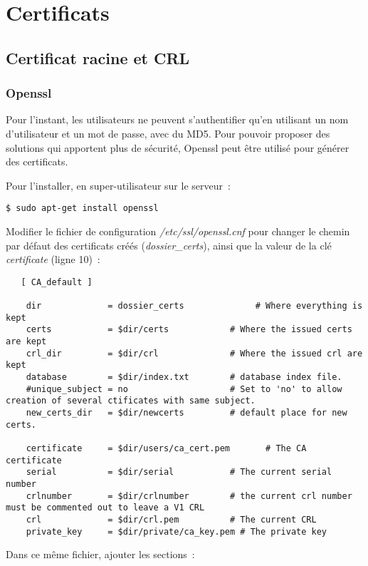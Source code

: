 \section{Certificats}
\subsection{Certificat racine et CRL}
\subsubsection{Openssl}

Pour l'instant, les utilisateurs ne peuvent s'authentifier qu'en utilisant un nom d'utilisateur et un mot de passe, avec du MD5. Pour pouvoir proposer des solutions qui apportent plus de sécurité, Openssl peut être utilisé pour générer des certificats.

Pour l'installer, en super-utilisateur sur le serveur~:

\begin{lstlisting}
$ sudo apt-get install openssl
\end{lstlisting}

Modifier le fichier de configuration \emph{/etc/ssl/openssl.cnf} pour changer le chemin par défaut des certificats créés (\emph{dossier\_certs}), ainsi que la valeur de la clé \emph{certificate} (ligne 10)~:

\begin{lstlisting}
   [ CA_default ]

    dir             = dossier_certs              # Where everything is kept
    certs           = $dir/certs            # Where the issued certs are kept
    crl_dir         = $dir/crl              # Where the issued crl are kept
    database        = $dir/index.txt        # database index file.
    #unique_subject = no                    # Set to 'no' to allow creation of several ctificates with same subject.
    new_certs_dir   = $dir/newcerts         # default place for new certs.

    certificate     = $dir/users/ca_cert.pem       # The CA certificate
    serial          = $dir/serial           # The current serial number
    crlnumber       = $dir/crlnumber        # the current crl number must be commented out to leave a V1 CRL
    crl             = $dir/crl.pem          # The current CRL
    private_key     = $dir/private/ca_key.pem # The private key
\end{lstlisting}

Dans ce m\^eme fichier, ajouter les sections~:


